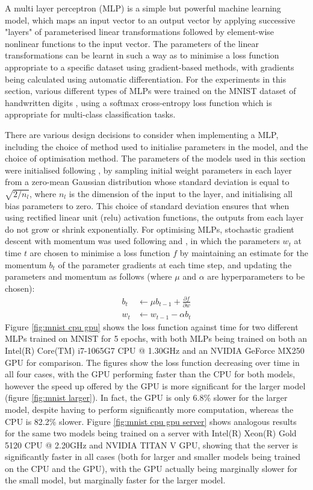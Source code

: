 A multi layer perceptron (MLP) is a simple but powerful machine learning model, which maps an input vector to an output vector by applying successive "layers" of parameterised linear transformations followed by element-wise nonlinear functions to the input vector. The parameters of the linear transformations can be learnt in such a way as to minimise a loss function appropriate to a specific dataset using gradient-based methods, with gradients being calculated using automatic differentiation. For the experiments in this section, various different types of MLPs were trained on the MNIST dataset of handwritten digits \cite{lecun2010mnist}, using a softmax cross-entropy loss function which is appropriate for multi-class classification tasks.

There are various design decisions to consider when implementing a MLP, including the choice of method used to initialise parameters in the model, and the choice of optimisation method. The parameters of the models used in this section were initialised following \cite{he2015delving}, by sampling initial weight parameters in each layer from a zero-mean Gaussian distribution whose standard deviation is equal to $\sqrt{2/n_l}$, where $n_l$ is the dimension of the input to the layer, and initialising all bias parameters to zero. This choice of standard deviation ensures that when using rectified linear unit (relu) activation functions, the outputs from each layer do not grow or shrink exponentially. For optimising MLPs, stochastic gradient descent with momentum was used following \cite{sutskever2013importance} and \cite{polyak1964some}, in which the parameters $w_t$ at time $t$ are chosen to minimise a loss function $f$ by maintaining an estimate for the momentum $b_t$ of the parameter gradients at each time step, and updating the parameters and momentum as follows (where $\mu$ and $\alpha$ are hyperparameters to be chosen):
\begin{align}
    b_t &\leftarrow \mu b_{t-1} + \frac{\partial f}{\partial w} \\
    w_t &\leftarrow w_{t-1} - \alpha b_t
\end{align}
Figure \ref{fig:mnist cpu gpu} shows the loss function against time for two different MLPs trained on MNIST for 5 epochs, with both MLPs being trained on both an Intel(R) Core(TM) i7-1065G7 CPU @ 1.30GHz and an NVIDIA GeForce MX250 GPU for comparison. The figures show the loss function decreasing over time in all four cases, with the GPU performing faster than the CPU for both models, however the speed up offered by the GPU is more significant for the larger model (figure \ref{fig:mnist larger}). In fact, the GPU is only 6.8\% slower for the larger model, despite having to perform significantly more computation, whereas the CPU is 82.2\% slower. Figure \ref{fig:mnist cpu gpu server} shows analogous results for the same two models being trained on a server with Intel(R) Xeon(R) Gold 5120 CPU @ 2.20GHz and NVIDIA TITAN V GPU, showing that the server is significantly faster in all cases (both for larger and smaller models being trained on the CPU and the GPU), with the GPU actually being marginally slower for the small model, but marginally faster for the larger model.

